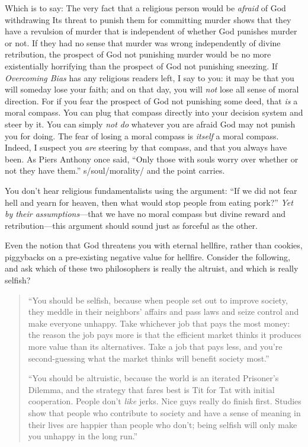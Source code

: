  Which is to say: The very fact that a religious person would be
\textit{afraid} of God withdrawing Its threat to punish them for
committing murder shows that they have a revulsion of murder that is
independent of whether God punishes murder or not. If they had no sense
that murder was wrong independently of divine retribution, the prospect
of God not punishing murder would be no more existentially horrifying
than the prospect of God not punishing sneezing. If \textit{Overcoming
Bias} has any religious readers left, I say to you: it may be that you
will someday lose your faith; and on that day, you will \textit{not}
lose all sense of moral direction. For if you fear the prospect of God
not punishing some deed, that \textit{is} a moral compass. You can plug
that compass directly into your decision system and steer by it. You
can simply \textit{not do} whatever you are afraid God may not punish
you for doing. The fear of losing a moral compass is \textit{itself} a
moral compass. Indeed, I suspect you \textit{are} steering by that
compass, and that you always have been. As Piers Anthony once said,
``Only those with souls worry over whether or not they
have them.'' s/soul/morality/ and the point carries.


 You don't hear religious fundamentalists using the
argument: ``If we did not fear hell and yearn for
heaven, then what would stop people from eating
pork?'' \textit{Yet by their assumptions}{}---that we
have no moral compass but divine reward and retribution---this argument
should sound just as forceful as the other.


 Even the notion that God threatens you with eternal hellfire,
rather than cookies, piggybacks on a pre-existing negative value for
hellfire. Consider the following, and ask which of these two
philosophers is really the altruist, and which is really selfish?

\begin{quotation}

 ``You should be selfish, because when people set
out to improve society, they meddle in their neighbors'
affairs and pass laws and seize control and make everyone unhappy. Take
whichever job that pays the most money: the reason the job pays more is
that the efficient market thinks it produces more value than its
alternatives. Take a job that pays less, and you're
second-guessing what the market thinks will benefit society
most.''

{
 ``You should be altruistic, because the world is
an iterated Prisoner's Dilemma, and the strategy that
fares best is Tit for Tat with initial cooperation. People
don't \textit{like} jerks. Nice guys really do finish
first. Studies show that people who contribute to society and have a
sense of meaning in their lives are happier than people who
don't; being selfish will only make you unhappy in the
long run.''}
\end{quotation}



